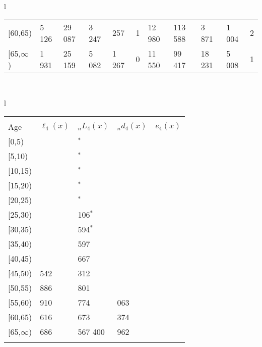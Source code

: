 \documentclass[
]{article}
\begin{document}
\begin{table}
\begin{tabular}[t]{l}
\begin{tabular}
{}[60,65) & 5 126 & 29 087 & 3 247 & 257 & 1 & 12 980 & 113 588 & 3 871 & 1 004 & 2\\
{}[65,$\infty$) & 1 931 & 25 159 & 5 082 & 1 267 & 0 & 11 550 & 99 417 & 18 231 & 5 008 & 1\\
\end{tabular}\\
\end{tabular}
\centering
\begin{tabular}[t]{l}
\hline
\begin{tabular}{>{\raggedright\arraybackslash}p{.43in}>{\raggedleft\arraybackslash}p{1.3in}>{\raggedleft\arraybackslash}p{1.3in}>{\raggedleft\arraybackslash}p{1.3in}>{\raggedleft\arraybackslash}p{1.3in}}
\toprule
\multicolumn{1}{c}{ } & \multicolumn{4}{c}{(4) Lost both} \\
\cmidrule(l{3pt}r{3pt}){2-5}
Age & $\ell_{4}(x)$ & ${}_nL_{4}(x)$ & ${}_nd_{4}(x)$ & $e_{4}(x)$\\
\midrule
{}[0,5) & 0 & 0$^{*}$ & 0 & 22\\
{}[5,10) & 0 & 0$^{*}$ & 0 & 22\\
{}[10,15) & 0 & 0$^{*}$ & 0 & 22\\
{}[15,20) & 0 & 568$^{*}$ & 0 & 22\\
{}[20,25) & 0 & 537$^{*}$ & 0 & 22\\
\addlinespace
{}[25,30) & 0 & 1 106$^{*}$ & 1 & 22\\
{}[30,35) & -1 & 4 594$^{*}$ & 5 & 22\\
{}[35,40) & -7 & 7 597 & 12 & 22\\
{}[40,45) & 936 & 18 667 & 37 & 22\\
{}[45,50) & 1 542 & 44 312 & 125 & 22\\
\addlinespace
{}[50,55) & 6 886 & 111 801 & 456 & 22\\
{}[55,60) & 13 910 & 174 774 & 1 063 & 22\\
{}[60,65) & 24 616 & 268 673 & 2 374 & 20\\
{}[65,$\infty$) & 29 686 & 1 567 400 & 78 962 & 18\\
\bottomrule
\multicolumn{5}{l}{\rule{0pt}{1em}\textsuperscript{*} Based on an estimated from SIPP with less than 10 respondents in the numerator.}\\
\end{tabular}\\
\end{tabular}
\end{table}
\end{document}
